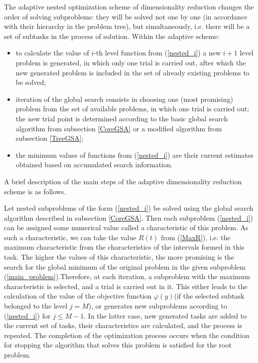 \documentclass[entropy,article,submit,moreauthors,pdftex]{Definitions/mdpi}
\begin{document}
The adaptive nested optimization scheme of dimensionality reduction changes the order of solving subproblems: they will be solved not one by one (in accordance with their hierarchy in the problem tree), but simultaneously, i.e. there will be a set of subtasks in the process of solution. Within the adaptive scheme:
\begin{itemize}
	\item 
to calculate the value of $i$-th level function from (\ref{nested_i}) a new $i+1$ level problem is generated, in which only one trial is carried out, after which the new generated problem is included in the set of already existing problems to be solved;
	\item 
	iteration of the global search consists in choosing one (most promising) problem from the set of available problems, in which one trial is carried out; the new trial point is determined according to the basic global search algorithm from subsection \ref{CoreGSA} or a modified algorithm from subsection  \ref{TreeGSA};
	\item
the minimum values of functions from  (\ref{nested_i}) are their current estimates obtained based on accumulated search information.
\end{itemize}

A brief description of the main steps of the adaptive dimensionality reduction scheme is as follows.

Let nested subproblems of the form (\ref{nested_i}) be solved using the global search algorithm described in subsection  \ref{CoreGSA}. Then each subproblem  (\ref{nested_i})  can be assigned some numerical value called a characteristic of this problem. As such a characteristic, we can take the value $R(t)$ from (\ref{MaxR}), i.e. the maximum characteristic from the characteristics of the intervals formed in this task. The higher the values of this characteristic, the more promising is the search for the global minimum of the original problem in the given subproblem (\ref{main_problem}).Therefore, at each iteration, a subproblem with the maximum characteristic is selected, and a trial is carried out in it. This either leads to the calculation of the value of the objective function  $\varphi(y)$(if the selected subtask belonged to the level  $j=M$), or generates new subproblems according to  (\ref{nested_i}) for $j\leq M-1$. In the latter case, new generated tasks are added to the current set of tasks, their characteristics are calculated, and the process is repeated. The completion of the optimization process occurs when the condition for stopping the algorithm that solves this problem is satisfied for the root problem.
\end{document}
